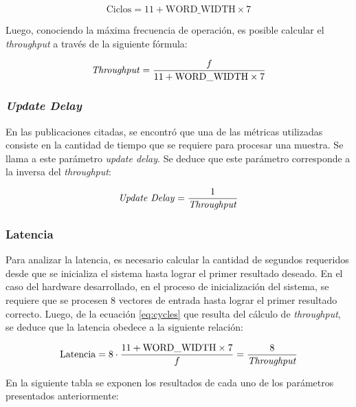 \begin{equation}
   \text{Ciclos} = 11 + \text{WORD\_WIDTH} \times 7
   \label{eq:cycles}
\end{equation}

Luego, conociendo la máxima frecuencia de operación, es posible calcular el \textit{throughput} a través de la siguiente fórmula:

\begin{equation}
   \text{\textit{Throughput}} = \frac{f}{11 + \text{WORD\_WIDTH} \times 7}
\end{equation}

\subsubsection{\textit{Update Delay}}

En las publicaciones citadas, se encontró que una de las métricas utilizadas consiste en la cantidad de tiempo que se requiere para procesar una muestra. Se llama a este parámetro \textit{update delay}. Se deduce que este parámetro corresponde a la inversa del \textit{throughput}:

\begin{equation}
   \text{\textit{Update Delay}} = \frac{1}{\text{\textit{Throughput}}}
\end{equation}

\subsubsection{Latencia}

Para analizar la latencia, es necesario calcular la cantidad de segundos requeridos desde que se inicializa el sistema hasta lograr el primer resultado deseado. En el caso del hardware desarrollado, en el proceso de inicialización del sistema, se requiere que se procesen 8 vectores de entrada hasta lograr el primer resultado correcto. Luego, de la ecuación \ref{eq:cycles} que resulta del cálculo de \textit{throughput}, se deduce que la latencia obedece a la siguiente relación:

\begin{equation}
   \text{Latencia} = 8 \cdot \frac{11 + \text{WORD\_WIDTH} \times 7}{f} = \frac{8}{\text{\textit{Throughput}}}
\end{equation}

En la siguiente tabla se exponen los resultados de cada uno de los parámetros presentados anteriormente:

